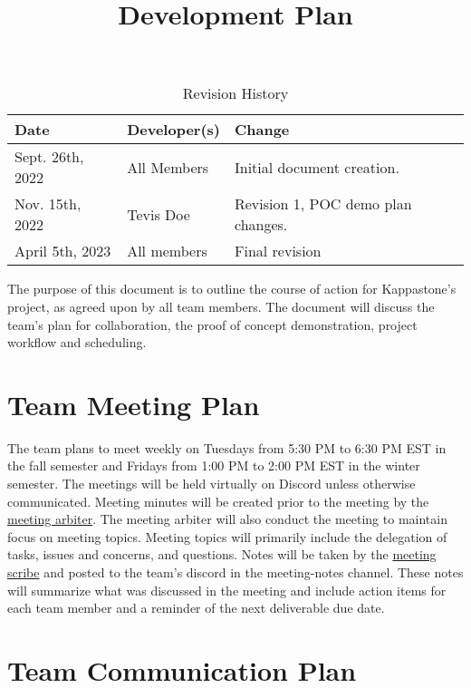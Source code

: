 \documentclass{article}
\title{Development Plan\\\progname}
\author{\authname}
\date{}
\begin{document}
\begin{table}[hp]
\caption{Revision History} \label{TblRevisionHistory}
\begin{tabularx}{\textwidth}{llX}
\toprule
\textbf{Date} & \textbf{Developer(s)} & \textbf{Change}\\
\midrule
Sept. 26th, 2022  & All Members & Initial document creation. \\
Nov. 15th, 2022 & Tevis Doe & Revision 1, POC demo plan changes. \\
April 5th, 2023 & All members & Final revision \\
\bottomrule
\end{tabularx}
\end{table}

\newpage

\maketitle

The purpose of this document is to outline the course of action for Kappastone's project, as agreed upon by all team members. The document will discuss the team's plan for collaboration, the proof of concept demonstration, project workflow and scheduling.   

\section{Team Meeting Plan}

The team plans to meet weekly on Tuesdays from 5:30 PM to 6:30 PM EST in the fall semester and Fridays from 1:00 PM to 2:00 PM EST in the winter semester. The meetings will be held virtually on Discord unless otherwise communicated. Meeting minutes will be created prior to the meeting by the \hyperref[role:meetingarb]{meeting arbiter}. The meeting arbiter will also conduct the meeting to maintain focus on meeting topics. Meeting topics will primarily include the delegation of tasks, issues and concerns, and questions. Notes will be taken by the \hyperref[role:meetingscrib]{meeting scribe} and posted to the team's discord in the meeting-notes channel. These notes will summarize what was discussed in the meeting and include action items for each team member and a reminder of the next deliverable due date.

\section{Team Communication Plan}
\end{document}
